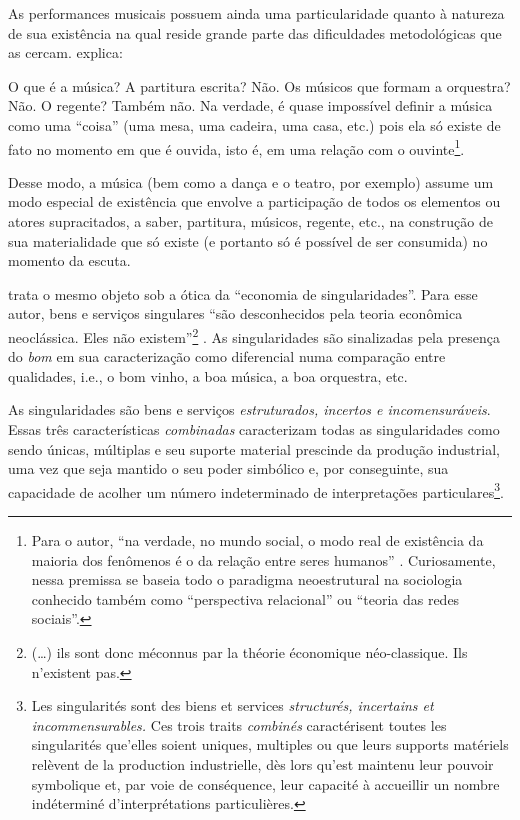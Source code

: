 \documentclass[a4paper, 12pt, openright, oneside, german, french, english, brazil, article]{abntex2}
\begin{document}
As performances musicais possuem ainda uma particularidade quanto à natureza de sua existência na qual reside grande parte das dificuldades metodológicas que as cercam.  explica:

\begin{citacao}
	O que é a música? A partitura escrita? Não. Os músicos que formam a orquestra? Não. O regente? Também não. Na verdade, é quase impossível definir a música como uma ``coisa'' (uma mesa, uma cadeira, uma casa, etc.) pois ela só existe de fato no momento em que é ouvida, isto é, em uma relação com o ouvinte\footnote{Para o autor, ``na verdade, no mundo social, o modo real de existência da maioria dos fenômenos é o da relação entre seres humanos'' \cite[p. 110]{tolila2007cultura}. Curiosamente, nessa premissa se baseia todo o paradigma neoestrutural na sociologia conhecido também como ``perspectiva relacional'' ou ``teoria das redes sociais''.}. \cite[p. 109]{tolila2007cultura}
\end{citacao}

Desse modo, a música (bem como a dança e o teatro, por exemplo) assume um modo especial de existência que envolve a participação de todos os elementos ou atores supracitados, a saber, partitura, músicos, regente, etc., na construção de sua materialidade que só existe (e portanto só é possível de ser consumida) no momento da escuta.

 trata o mesmo objeto sob a ótica da ``economia de singularidades''. Para esse autor, bens e serviços singulares ``são desconhecidos pela teoria econômica neoclássica. Eles não existem''\footnote{(\dots) ils sont donc méconnus par la théorie économique néo-classique. Ils n'existent pas.} \cite[p. 163]{karpik2009elements}. As singularidades são sinalizadas pela presença do \textit{bom} em sua caracterização como diferencial numa comparação entre qualidades, i.e., o bom vinho, a boa música, a boa orquestra, etc. 

\begin{citacao}
As singularidades são bens e serviços \textit{estruturados, incertos e incomensuráveis}. Essas três características \textit{combinadas} caracterizam todas as singularidades como sendo únicas, múltiplas e seu suporte material prescinde da produção industrial, uma vez que seja mantido o seu poder simbólico e, por conseguinte, sua capacidade de acolher um número indeterminado de interpretações particulares\footnote{Les singularités sont des biens et services \textit{structurés, incertains et incommensurables.} Ces trois traits \textit{combinés} caractérisent toutes les singularités que'elles soient uniques, multiples ou que leurs supports matériels relèvent de la production industrielle, dès lors qu'est maintenu leur pouvoir symbolique et, par voie de conséquence, leur capacité à accueillir un nombre indéterminé d'interprétations particulières.}. \cite[p. 164]{karpik2009elements}
\end{citacao}
\end{document}
